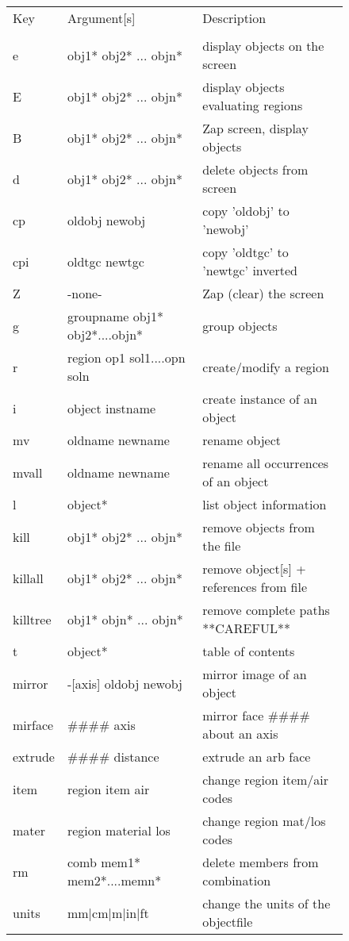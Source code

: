\begin{figure}[tb]
\begin{tabular}{l l l}
Key	& Argument[s]	& Description \\
\\
  e	& obj1* obj2* ... objn*	& display objects on the screen \\
  E	& obj1* obj2* ... objn*	& display objects evaluating regions \\
  B	& obj1* obj2* ... objn*	& Zap screen, display objects \\
  d	& obj1* obj2* ... objn*	& delete objects from screen \\
  cp	& oldobj newobj	& copy 'oldobj' to 'newobj' \\
  cpi	& oldtgc newtgc	& copy 'oldtgc' to 'newtgc' inverted \\
  Z	& -none-	& Zap (clear) the screen \\
  g	& groupname obj1* obj2*....objn*	& group objects \\
  r	& region op1 sol1....opn soln	& create/modify a region \\
  i	& object instname	& create instance of an object \\
  mv	& oldname newname	& rename object \\
  mvall	& oldname newname	& rename all occurrences of an object \\
  l	& object*	& list object information \\
  kill	& obj1* obj2* ... objn*	& remove objects from the file \\
  killall	& obj1* obj2* ... objn*	& remove object[s] + references from file \\
  killtree	& obj1* objn* ... objn*	& remove complete paths  **CAREFUL** \\
  t	& object*	& table of contents \\
  mirror	& -[axis] oldobj newobj	& mirror image of an object \\
  mirface	& \#\#\#\# axis	& mirror face \#\#\#\# about an axis \\
  extrude	& \#\#\#\# distance	& extrude an arb face \\
  item	& region item air	& change region item/air codes \\
  mater	& region material los	& change region mat/los codes \\
  rm	& comb mem1* mem2*....memn*	& delete members from combination \\
  units	& mm|cm|m|in|ft	& change the units of the objectfile \\

\end{tabular}
\end{figure}
